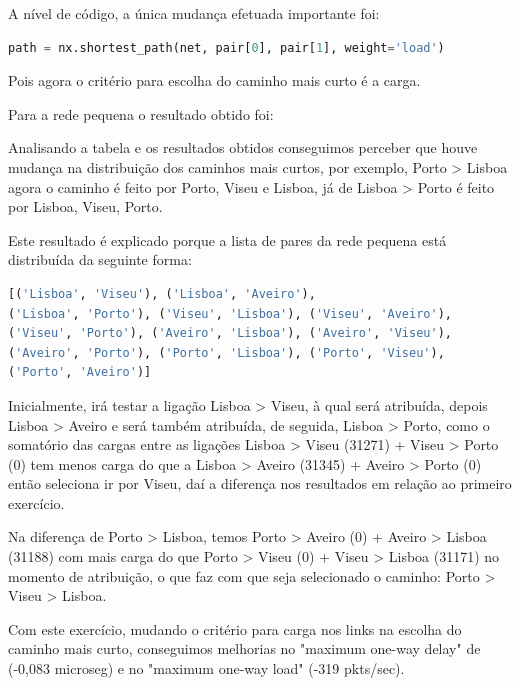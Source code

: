 \documentclass[pdftex,12pt,a4paper]{report}
\begin{document}
A nível de código, a única mudança efetuada importante foi:
\begin{lstlisting}[language=python]
path = nx.shortest_path(net, pair[0], pair[1], weight='load')
\end{lstlisting}

Pois agora o critério para escolha do caminho mais curto é a carga.

Para a rede pequena o resultado obtido foi:



Analisando a tabela e os resultados obtidos conseguimos perceber que houve mudança na distribuição dos caminhos mais curtos, por exemplo, Porto > Lisboa agora o caminho é feito por Porto, Viseu e Lisboa, já de Lisboa > Porto é feito por Lisboa, Viseu, Porto.

Este resultado é explicado porque a lista de pares da rede pequena está distribuída da seguinte forma:

\begin{lstlisting}[language=python]
[('Lisboa', 'Viseu'), ('Lisboa', 'Aveiro'),
('Lisboa', 'Porto'), ('Viseu', 'Lisboa'), ('Viseu', 'Aveiro'),
('Viseu', 'Porto'), ('Aveiro', 'Lisboa'), ('Aveiro', 'Viseu'), 
('Aveiro', 'Porto'), ('Porto', 'Lisboa'), ('Porto', 'Viseu'),
('Porto', 'Aveiro')]
\end{lstlisting}

Inicialmente, irá testar a ligação Lisboa > Viseu, à qual será atribuída, depois Lisboa > Aveiro e será também atribuída, de seguida, Lisboa > Porto, como o somatório das cargas entre as ligações Lisboa > Viseu (31271) + Viseu > Porto (0) tem menos carga do que a Lisboa > Aveiro (31345) + Aveiro > Porto (0) então seleciona ir por Viseu, daí a diferença nos resultados em relação ao primeiro exercício.
 
Na diferença de Porto > Lisboa, temos Porto > Aveiro (0)  + Aveiro > Lisboa (31188) com mais carga do que Porto > Viseu (0) + Viseu > Lisboa (31171) no momento de atribuição, o que faz com que seja selecionado o caminho: Porto > Viseu > Lisboa.





Com este exercício, mudando o critério para carga nos links na escolha do caminho mais curto, conseguimos melhorias no "maximum one-way delay" de (-0,083 microseg)   e no "maximum one-way load" (-319 pkts/sec). 

\end{document}
